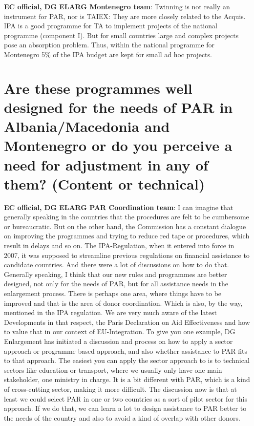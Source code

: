 \textbf{EC official, DG ELARG Montenegro team}: Twinning is not really an instrument for PAR, nor is TAIEX: They are more closely related to the Acquis. IPA is a good programme for TA to implement projects of the national programme (component I). But for small countries large and complex projects pose an absorption problem. Thus, within the national programme for Montenegro 5\% of the IPA budget are kept for small ad hoc projects.\\
\section{Are these programmes well designed for the needs of PAR in Albania/Macedonia and Montenegro or do you perceive a need for adjustment in any of them? (Content or technical) }
\textbf{EC official, DG ELARG PAR Coordination team}: I can imagine that generally speaking in the countries that the procedures are felt to be cumbersome or bureaucratic. But on the other hand, the Commission has a constant dialogue on improving the programmes and trying to reduce red tape or procedures, which result in delays and so on. The IPA-Regulation, when it entered into force in 2007, it was supposed to streamline previous regulations on financial assistance to candidate countries. And there were a lot of discussions on how to do that. Generally speaking, I think that our new rules and programmes are better designed, not only for the needs of PAR, but for all assistance needs in the enlargement process. There is perhaps one area, where things have to be improved and that is the area of donor coordination. Which is also, by the way, mentioned in the IPA regulation. We are very much aware of the latest Developments in that respect, the Paris Declaration on Aid Effectiveness and how to value that in our context of EU-Integration. To give you one example, DG Enlargement has initiated a discussion and process on how to apply a sector approach or programme based approach, and also whether assistance to PAR fits to that approach. The easiest you can apply the sector approach to is to technical sectors like education or transport, where we usually only have one main stakeholder, one ministry in charge. It is a bit different with PAR, which is a kind of cross-cutting sector, making it more difficult. The discussion now is that at least we could select PAR in one or two countries as a sort of pilot sector for this approach. If we do that, we can learn a lot to design assistance to PAR better to the needs of the country and also to avoid a kind of overlap with other donors. \\
